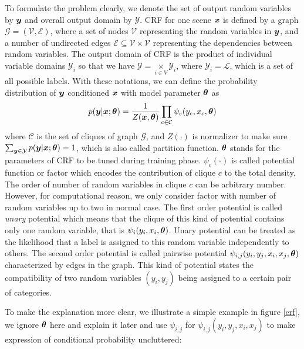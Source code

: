 To formulate the problem clearly, we denote the set of output random variables by $\boldsymbol y$ and overall output domain by $\mathcal{Y}$. CRF for one scene $\boldsymbol x$ is defined by a graph $\mathcal{G} = (\mathcal{V}, \mathcal{E})$, where a set of nodes $\mathcal{V}$ representing the random variables in $\boldsymbol y$, and a number of undirected edges $\mathcal{E}\subseteq\mathcal{V}\times\mathcal{V}$ representing the dependencies between random variables. The output domain of CRF is the product of individual variable domains $\mathcal{Y}_i$ so that we have $\mathcal{Y} = \underset{i\in V}{\times} \mathcal{Y}_i$, where $\mathcal{Y}_i = \mathcal{L}$, which is a set of all possible labels. With these notations, we can define the probability distribution of $\boldsymbol y$ conditioned $\boldsymbol x$ with model parameter $\boldsymbol \theta$ as 
\begin{equation}
\label{crf}
\begin{aligned}
p(\boldsymbol y|\boldsymbol x; \boldsymbol \theta) = \frac{1}{Z(\boldsymbol x, \boldsymbol \theta)}\prod_{c\in\mathcal{C}}\psi_{c}(y_c, x_c, \boldsymbol \theta)
\end{aligned}
\end{equation}
where $\mathcal{C}$ is the set of cliques of graph $\mathcal{G}$, and $Z(\cdot)$ is normalizer to make sure $\sum_{\boldsymbol y \in \mathcal{Y}}p(\boldsymbol y | \boldsymbol x; \boldsymbol \theta) = 1$, which is also called partition function. $\boldsymbol \theta$ stands for the parameters of CRF to be tuned during training phase. $\psi_c(\cdot)$ is called potential function or factor which encodes the contribution of clique $c$ to the total density. The order of number of random variables in clique $c$ can be arbitrary number. However, for computational reason, we only consider factor with number of random variables up to two in normal case. The first order potential is called \textit{unary} potential which means that the clique of this kind of potential contains only one random variable, that is $\psi_i(y_i, x_i, \boldsymbol \theta)$. Unary potential can be treated as the likelihood that a label is assigned to this random variable independently to others. The second order potential is called pairwise potential $\psi_{i,j}(y_i,y_j, x_i, x_j, \boldsymbol \theta)$ characterized by edges in the graph. This kind of potential states the compatibility of two random variables $(y_i,y_j)$ being assigned to a certain pair of categories. 

To make the explanation more clear, we illustrate a simple example in figure \ref{crf}, we ignore $\boldsymbol \theta$ here and explain it later and use $\psi_{i,j}$ for $\psi_{i,j}(y_i,y_j,x_i,x_j)$ to make expression of conditional probability uncluttered:

